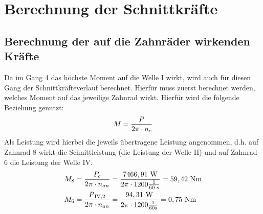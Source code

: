 \newpage
\chapter{Berechnung der Schnittkräfte}
\section{Berechnung der auf die Zahnräder wirkenden Kräfte}

Da im Gang 4 das höchste Moment auf die Welle I wirkt, wird auch für diesen Gang der Schnittkräfteverlauf berechnet. Hierfür muss zuerst berechnet werden, welches Moment auf das jeweilige Zahnrad wirkt. Hierfür wird die folgende Beziehung genutzt:
\[M = \frac{P}{2\pi \cdot n_c}\] 
Als Leistung wird hierbei die jeweils übertragene Leistung angenommen, d.h. auf Zahnrad 8 wirkt die Schnittleistung (die Leistung der Welle II) und auf Zahnrad 6 die Leistung der Welle IV.
	\begin{align*}
M_8 &= \frac{P_c}{2\pi \cdot n_{an}} = \frac{7466,91 \text { W}}{2\pi \cdot 1200 \frac{1}{60 \text{ s}}}= 59,42 \text{ Nm}\\
M_6 &= \frac{P\textsubscript{IV,2}}{2\pi \cdot n_{an}} = \frac{94,31 \text{ W}}{2\pi \cdot 1200 \frac{1}{60 \text{s}}}= 0,75 \text{ Nm}\\
\end{align*}

